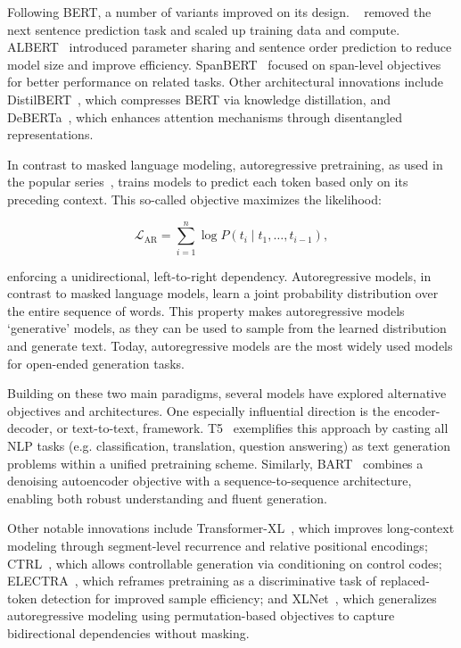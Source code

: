 Following BERT, a number of variants improved on its design. ~\citep{liu2019roberta} removed the next sentence prediction task and scaled up training data and compute. ALBERT~\citep{lan2019albert} introduced parameter sharing and sentence order prediction to reduce model size and improve efficiency. SpanBERT~\citep{joshi2020spanbert} focused on span-level objectives for better performance on related tasks. Other architectural innovations include DistilBERT~\citep{sanh2019distilbert}, which compresses BERT via knowledge distillation, and DeBERTa~\citep{he2021deberta}, which enhances attention mechanisms through disentangled representations.

In contrast to masked language modeling, autoregressive pretraining, as used in the popular  series~\citep{radford2018gpt1, radford2019gpt2, brown2020gpt3}, trains models to predict each token based only on its preceding context. This so-called  objective maximizes the likelihood:

\begin{equation}
\mathcal{L}_{\text{AR}} = \sum_{i=1}^n \log P(t_i \mid t_1, \ldots, t_{i-1}),
\label{eq:ar-loss}
\end{equation}

enforcing a unidirectional, left-to-right dependency. Autoregressive models, in contrast to masked language models, learn a joint probability distribution over the entire sequence of words. This property makes autoregressive models `generative' models, as they can be used to sample from the learned distribution and generate text. Today, autoregressive models are the most widely used models for open-ended generation tasks.

Building on these two main paradigms, several models have explored alternative objectives and architectures. One especially influential direction is the encoder-decoder, or text-to-text, framework. T5~\citep{raffel2020t5} exemplifies this approach by casting all NLP tasks (e.g. classification, translation, question answering) as text generation problems within a unified pretraining scheme. Similarly, BART~\citep{lewis2020bart} combines a denoising autoencoder objective with a sequence-to-sequence architecture, enabling both robust understanding and fluent generation.

Other notable innovations include Transformer-XL~\citep{dai2019transformer}, which improves long-context modeling through segment-level recurrence and relative positional encodings; CTRL~\citep{keskar2019ctrl}, which allows controllable generation via conditioning on control codes; ELECTRA~\citep{clark2020electra}, which reframes pretraining as a discriminative task of replaced-token detection for improved sample efficiency; and XLNet~\citep{yang2019xlnet}, which generalizes autoregressive modeling using permutation-based objectives to capture bidirectional dependencies without masking.

